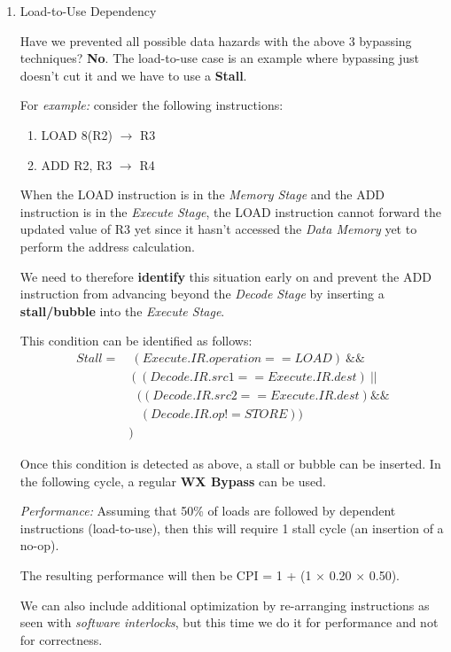 \documentclass[12pt]{article}
\newenvironment{QandA}{\begin{enumerate}[label=\bfseries\alph*.]\bfseries}
                      {\end{enumerate}}
\newenvironment{answered}{\par\quad\normalfont}{}
\begin{document}
\begin{QandA}
    \item Load-to-Use Dependency
    \begin{answered}
    Have we prevented all possible data hazards with the above 3 bypassing techniques? \textbf{No}. The load-to-use case is an example where bypassing just doesn't cut it and we have to use a \textbf{Stall}.
    
    For \textit{example:} consider the following instructions:
    \begin{enumerate}
        \item LOAD 8(R2) $\rightarrow$ R3
        \item ADD R2, R3 $\rightarrow$ R4
    \end{enumerate}
    When the LOAD instruction is in the \textit{Memory Stage} and the ADD instruction is in the \textit{Execute Stage}, the LOAD instruction cannot forward the updated value of R3 yet since it hasn't accessed the \textit{Data Memory} yet to perform the address calculation. 
    
    We need to therefore \textbf{identify} this situation early on and prevent the ADD instruction from advancing beyond the \textit{Decode Stage} by inserting a \textbf{stall/bubble} into the \textit{Execute Stage}.
    
    This condition can be identified as follows:
    \begin{equation*}
    \begin{split}
    Stall = &\ (Execute.IR.operation == LOAD)\ \&\& \\ &\ (\ (Decode.IR.src1 == Execute.IR.dest)\ || \\ &\ \ \ ((Decode.IR.src2 == Execute.IR.dest) \&\& \\ &\ \ \ \ (Decode.IR.op != STORE)) \\ &)
    \end{split}
    \end{equation*}     
    
    Once this condition is detected as above, a stall or bubble can be inserted. In the following cycle, a regular \textbf{WX Bypass} can be used.
    
    \textit{Performance:} Assuming that 50\% of loads are followed by dependent instructions (load-to-use), then this will require 1 stall cycle (an insertion of a no-op).
    
    The resulting performance will then be CPI = 1 + (1 $\times$ 0.20 $\times$ 0.50).
    
    We can also include additional optimization by re-arranging instructions as seen with \textit{software interlocks}, but this time we do it for performance and not for correctness. 
    \end{answered}


\end{QandA}
\end{document}
